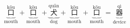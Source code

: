\[ \underbrace{\overset{\text{kǒu}}{\text{口}}}_{\text{mouth}} + \underbrace{\overset{\text{kǒu}}{\text{口}}}_{\text{mouth}} + \underbrace{\overset{\text{quǎn}}{\text{犬}}}_{\text{dog}} + \underbrace{\overset{\text{kǒu}}{\text{口}}}_{\text{mouth}} + \underbrace{\overset{\text{kǒu}}{\text{口}}}_{\text{mouth}} = \underbrace{\overset{\text{qì}}{\text{器}}}_{\text{device}} \]

